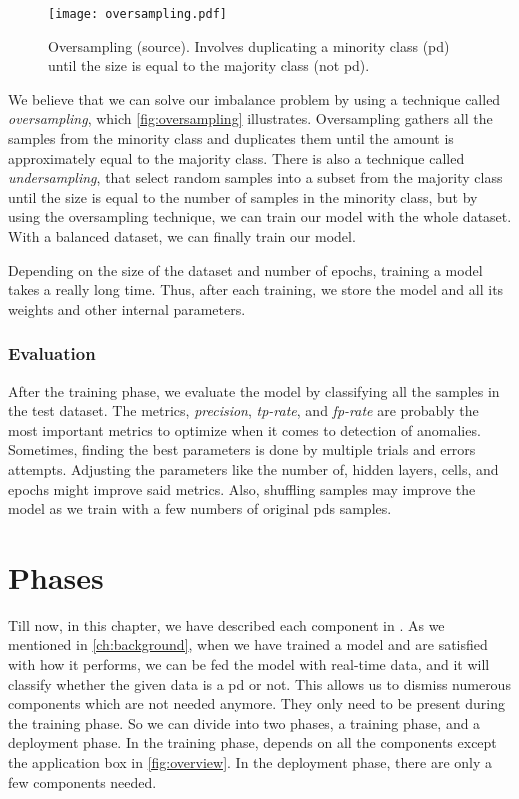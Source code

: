 \begin{figure}[ht]
    \centering
    \texttt{[image: oversampling.pdf]}
    \caption[Oversampling dataset]{Oversampling (source\cite{tw_imbalance}). Involves duplicating a minority class (\ac{pd}) until the size is equal to the majority class (not \ac{pd}).}
    \label{fig:oversampling}
\end{figure}

We believe that we can solve our imbalance problem by using a technique called \emph{oversampling}, which \autoref{fig:oversampling} illustrates. Oversampling gathers all the samples from the minority class and duplicates them until the amount is approximately equal to the majority class. There is also a technique called \emph{undersampling}, that select random samples into a subset from the majority class until the size is equal to the number of samples in the minority class, but by using the oversampling technique, we can train our model with the whole dataset. With a balanced dataset, we can finally train our model.

Depending on the size of the dataset and number of epochs, training a model takes a really long time. Thus, after each training, we store the model and all its weights and other internal parameters.

\subsubsection{Evaluation}
After the training phase, we evaluate the model by classifying all the samples in the test dataset. The metrics, \emph{precision}, \emph{tp-rate}, and \emph{fp-rate} are probably the most important metrics to optimize when it comes to detection of anomalies. Sometimes, finding the best parameters is done by multiple trials and errors attempts. Adjusting the parameters like the number of, hidden layers, cells, and epochs might improve said metrics. Also, shuffling samples may improve the model as we train with a few numbers of original \acp{pd} samples.

\newpage
\section{Phases}
Till now, in this chapter, we have described each component in \project. As we mentioned in \autoref{ch:background}, when we have trained a model and are satisfied with how it performs, we can be fed the model with real-time data, and it will classify whether the given data is a \ac{pd} or not. This allows us to dismiss numerous components which are not needed anymore. They only need to be present during the training phase. So we can divide \project into two phases, a training phase, and a deployment phase. In the training phase, \project depends on all the components except the application box in \autoref{fig:overview}. In the deployment phase, there are only a few components needed.

